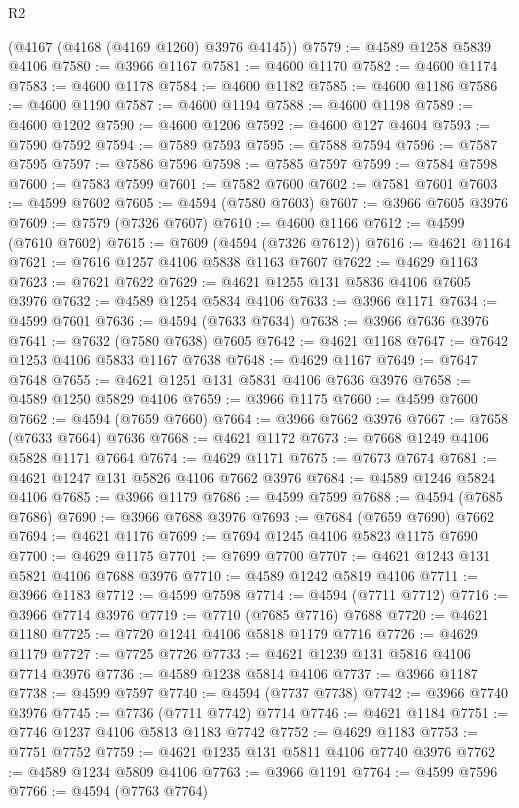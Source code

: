 \begin{lexlean}{R2}
\begin{coremodule}
    (@4167 (@4168 (@4169 @1260) @3976 @4145))
@7579 := @4589 @1258 @5839 @4106
@7580 := @3966 @1167
@7581 := @4600 @1170
@7582 := @4600 @1174
@7583 := @4600 @1178
@7584 := @4600 @1182
@7585 := @4600 @1186
@7586 := @4600 @1190
@7587 := @4600 @1194
@7588 := @4600 @1198
@7589 := @4600 @1202
@7590 := @4600 @1206
@7592 := @4600 @127 @4604
@7593 := @7590 @7592
@7594 := @7589 @7593
@7595 := @7588 @7594
@7596 := @7587 @7595
@7597 := @7586 @7596
@7598 := @7585 @7597
@7599 := @7584 @7598
@7600 := @7583 @7599
@7601 := @7582 @7600
@7602 := @7581 @7601
@7603 := @4599 @7602
@7605 := @4594 (@7580 @7603)
@7607 := @3966 @7605 @3976
@7609 := @7579 (@7326 @7607)
@7610 := @4600 @1166
@7612 := @4599 (@7610 @7602)
@7615 := @7609 (@4594 (@7326 @7612))
@7616 := @4621 @1164
@7621 := @7616 @1257 @4106 @5838 @1163 @7607
@7622 := @4629 @1163
@7623 := @7621 @7622
@7629 := @4621 @1255 @131 @5836 @4106 @7605 @3976
@7632 := @4589 @1254 @5834 @4106
@7633 := @3966 @1171
@7634 := @4599 @7601
@7636 := @4594 (@7633 @7634)
@7638 := @3966 @7636 @3976
@7641 := @7632 (@7580 @7638) @7605
@7642 := @4621 @1168
@7647 := @7642 @1253 @4106 @5833 @1167 @7638
@7648 := @4629 @1167
@7649 := @7647 @7648
@7655 := @4621 @1251 @131 @5831 @4106 @7636 @3976
@7658 := @4589 @1250 @5829 @4106
@7659 := @3966 @1175
@7660 := @4599 @7600
@7662 := @4594 (@7659 @7660)
@7664 := @3966 @7662 @3976
@7667 := @7658 (@7633 @7664) @7636
@7668 := @4621 @1172
@7673 := @7668 @1249 @4106 @5828 @1171 @7664
@7674 := @4629 @1171
@7675 := @7673 @7674
@7681 := @4621 @1247 @131 @5826 @4106 @7662 @3976
@7684 := @4589 @1246 @5824 @4106
@7685 := @3966 @1179
@7686 := @4599 @7599
@7688 := @4594 (@7685 @7686)
@7690 := @3966 @7688 @3976
@7693 := @7684 (@7659 @7690) @7662
@7694 := @4621 @1176
@7699 := @7694 @1245 @4106 @5823 @1175 @7690
@7700 := @4629 @1175
@7701 := @7699 @7700
@7707 := @4621 @1243 @131 @5821 @4106 @7688 @3976
@7710 := @4589 @1242 @5819 @4106
@7711 := @3966 @1183
@7712 := @4599 @7598
@7714 := @4594 (@7711 @7712)
@7716 := @3966 @7714 @3976
@7719 := @7710 (@7685 @7716) @7688
@7720 := @4621 @1180
@7725 := @7720 @1241 @4106 @5818 @1179 @7716
@7726 := @4629 @1179
@7727 := @7725 @7726
@7733 := @4621 @1239 @131 @5816 @4106 @7714 @3976
@7736 := @4589 @1238 @5814 @4106
@7737 := @3966 @1187
@7738 := @4599 @7597
@7740 := @4594 (@7737 @7738)
@7742 := @3966 @7740 @3976
@7745 := @7736 (@7711 @7742) @7714
@7746 := @4621 @1184
@7751 := @7746 @1237 @4106 @5813 @1183 @7742
@7752 := @4629 @1183
@7753 := @7751 @7752
@7759 := @4621 @1235 @131 @5811 @4106 @7740 @3976
@7762 := @4589 @1234 @5809 @4106
@7763 := @3966 @1191
@7764 := @4599 @7596
@7766 := @4594 (@7763 @7764)

\end{coremodule}
\end{lexlean}
